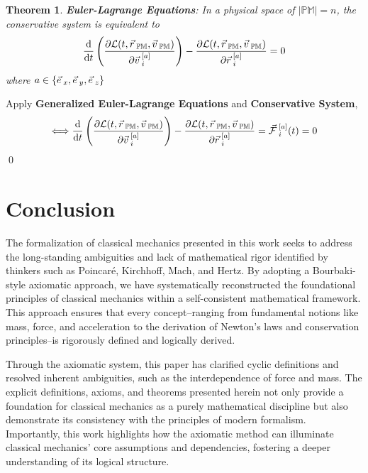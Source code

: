 \documentclass[12pt]{amsart}
\newtheorem{theorem}{Theorem}[section]
\renewenvironment{proof}{{\bfseries Proof.}}{\qed}
\let\oldvec\vec
\renewcommand{\vec}[1]{\oldvec{#1}\hspace{0.1em}}
\begin{document}
\begin{theorem}
    \textbf{Euler-Lagrange Equations}: In a physical space of $\left | \mathbb{PM} \right | = n$, the conservative system is equivalent to 
    $$
    \dfrac{\mathrm{d}}{\mathrm{d}  t} \left ( \dfrac{\partial \mathcal{L} (t, \vec{r}_\mathbb{PM}, \vec{v}_\mathbb{PM})}{\partial \vec{v}^{[a]}_i}  \right ) - \dfrac{\partial \mathcal{L} (t, \vec{r}_\mathbb{PM}, \vec{v}_\mathbb{PM})}{\partial \vec{r}^{[a]}_i} = 0
    $$
    where $a \in \{ \vec{e}_x, \vec{e}_y, \vec{e}_z \}$
\end{theorem}

\begin{proof}
    Apply \textbf{Generalized Euler-Lagrange Equations} and \textbf{Conservative System},
    $$\Longleftrightarrow \dfrac{\mathrm{d}}{\mathrm{d}  t} \left ( \dfrac{\partial \mathcal{L} (t, \vec{r}_\mathbb{PM}, \vec{v}_\mathbb{PM})}{\partial \vec{v}^{[a]}_i}  \right ) - \dfrac{\partial \mathcal{L} (t, \vec{r}_\mathbb{PM}, \vec{v}_\mathbb{PM})}{\partial \vec{r}^{[a]}_i } = \vec{\mathcal{F}}^{[a]}_i (t) = 0$$
\end{proof}



\newpage

\section{Conclusion}

The formalization of classical mechanics presented in this work seeks to address the long-standing ambiguities and lack of mathematical rigor identified by thinkers such as Poincaré, Kirchhoff, Mach, and Hertz. By adopting a Bourbaki-style axiomatic approach, we have systematically reconstructed the foundational principles of classical mechanics within a self-consistent mathematical framework. This approach ensures that every concept--ranging from fundamental notions like mass, force, and acceleration to the derivation of Newton's laws and conservation principles--is rigorously defined and logically derived.

Through the axiomatic system, this paper has clarified cyclic definitions and resolved inherent ambiguities, such as the interdependence of force and mass. The explicit definitions, axioms, and theorems presented herein not only provide a foundation for classical mechanics as a purely mathematical discipline but also demonstrate its consistency with the principles of modern formalism. Importantly, this work highlights how the axiomatic method can illuminate classical mechanics' core assumptions and dependencies, fostering a deeper understanding of its logical structure.
\end{document}
